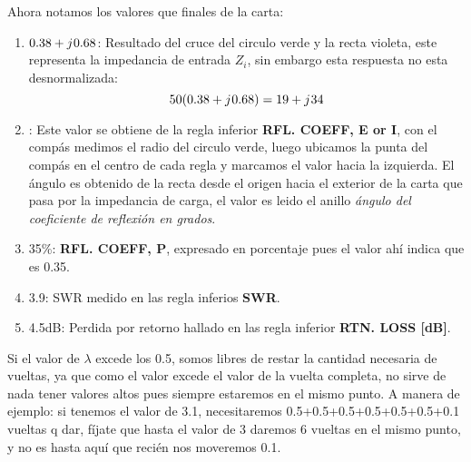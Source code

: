 \documentclass[
	12pt, %
	fleqn, %
	a4paper, %
	oneside, %
]{LegrandOrangeBook}
\begin{document}
\begin{example}
\begin{center}
\end{center}
Ahora notamos los valores que finales de la carta:
\begin{enumerate}
\item $0.38+{j\mkern1mu} 0.68$: Resultado del cruce del circulo verde y la recta violeta, este representa la impedancia de entrada $Z_i$, sin embargo esta respuesta no esta desnormalizada:
\begin{displaymath}
50(0.38+{j\mkern1mu} 0.68)=19+{j\mkern1mu} 34
\end{displaymath}
\item {}: Este valor se obtiene de la regla inferior \textbf{RFL. COEFF, E or I}, con el compás medimos el radio del circulo verde, luego ubicamos la punta del compás en el centro de cada regla y marcamos el valor hacia la izquierda. El ángulo es obtenido de la recta desde el origen hacia el exterior de la carta que pasa por la impedancia de carga, el valor es leido el anillo \emph{ángulo del coeficiente de reflexión en grados}.
\item 35\%: \textbf{RFL. COEFF, P}, expresado en porcentaje pues el valor ahí indica que es 0.35.
\item 3.9: SWR medido en las regla inferios \textbf{SWR}.
\item 4.5dB: Perdida por retorno hallado en las regla inferior \textbf{RTN. LOSS [dB]}.
\end{enumerate}
\end{example}
\begin{remark}
Si el valor de $\lambda$ excede los 0.5, somos libres de restar la cantidad necesaria de vueltas, ya que como el valor excede el valor de la vuelta completa, no sirve de nada tener valores altos pues siempre estaremos en el mismo punto. A manera de ejemplo: si tenemos el valor de 3.1, necesitaremos 0.5+0.5+0.5+0.5+0.5+0.5+0.1 vueltas q dar, fíjate que hasta el valor de 3 daremos 6 vueltas en el mismo punto, y no es hasta aquí que recién nos moveremos 0.1.
\end{remark}
\end{document}
